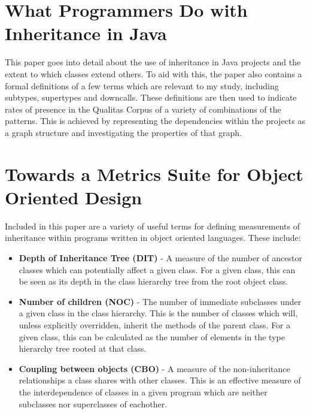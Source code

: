 \section{What Programmers Do with Inheritance in Java~\cite{InheritanceInJava}}
This paper goes into detail about the use of inheritance in Java projects and the extent to which classes extend others. To aid with this, the paper also contains a formal definitions of a few terms which are relevant to my study, including subtypes, supertypes and downcalls. These definitions are then used to indicate rates of presence in the Qualitas Corpus of a variety of combinations of the patterns. This is achieved by representing the dependencies within the projects as a graph structure and investigating the properties of that graph.

\section{Towards a Metrics Suite for Object Oriented Design~\cite{MetricsSuite}}
Included in this paper are a variety of useful terms for defining measurements of inheritance within programs written in object oriented languages. These include:
\begin{itemize}
	\item \textbf{Depth of Inheritance Tree (DIT)} - A measure of the number of ancestor classes which can potentially affect a given class. For a given class, this can be seen as its depth in the class hierarchy tree from the root object class.
	\item \textbf{Number of children (NOC)} - The number of immediate subclasses under a given class in the class hierarchy. This is the number of classes which will, unless explicitly overridden, inherit the methods of the parent class. For a given class, this can be calculated as the number of elements in the type hierarchy tree rooted at that class. 
	\item \textbf{Coupling between objects (CBO)} - A measure of the non-inheritance relationships a class shares with other classes. This is an effective measure of the interdependence of classes in a given program which are neither subclasses nor superclasses of eachother.
\end{itemize}

